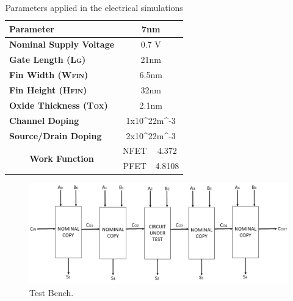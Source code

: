\documentclass[ecp,tc, english]{iiufrgs}
\begin{document}
\begin{table}[H]
\centering
\caption{Parameters applied in the electrical simulations}
\label{electPar}
\begin{tabular}{lcc}
\hline
\textbf{Parameter}                                            & \multicolumn{2}{c}{\textbf{7nm}}                                  \\ \hline
\textbf{Nominal Supply Voltage}                               & \multicolumn{2}{c}{0.7 V}                                         \\ \hline
\textbf{Gate Length (L\textsc{g})}           & \multicolumn{2}{c}{21nm}                                          \\ \hline
\textbf{Fin Width (W\textsc{fin})}              & \multicolumn{2}{c}{6.5nm}                                         \\ \hline
\textbf{Fin Height (H\textsc{fin})}          & \multicolumn{2}{c}{32nm}                                          \\ \hline
\textbf{Oxide Thickness (T\textsc{ox})}      & \multicolumn{2}{c}{2.1nm}                                         \\ \hline
\textbf{Channel Doping}                                       & \multicolumn{2}{c}{1x10^{22}m^{-3}}                                     \\ \hline
\textbf{Source/Drain Doping}                                  & \multicolumn{2}{c}{2x10^{22}m^{-3}} \\ \hline
\multicolumn{1}{c}{\multirow{2}{*}{\textbf{Work Function}}} & NFET                            & 4.372                            \\ \cline{2-3} 
\multicolumn{1}{c}{}                                        & PFET                            & 4.8108                           \\ \hline
\end{tabular}
\end{table}

\begin{figure}[H]
\centering
\includegraphics[width=\textwidth]{testbench.jpg}
\caption{Test Bench.}
\label{fig:Fig6}
\end{figure}
\end{document}
